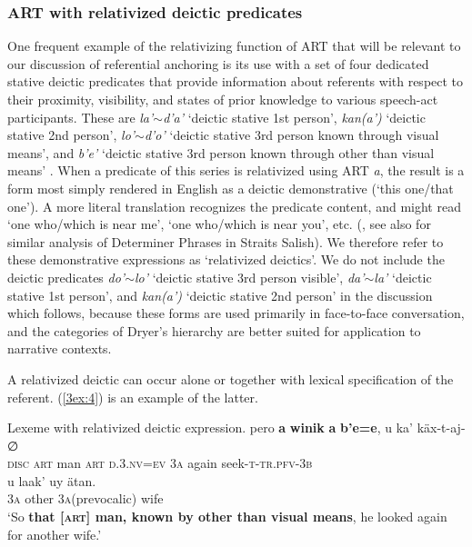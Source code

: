 \documentclass[output=paper]{langsci/langscibook}
\begin{document}
\subsubsection{ART with relativized deictic predicates}\label{3sec:211}

One frequent example of the relativizing function of ART that will be relevant to our discussion of referential anchoring is its use with a set of four dedicated stative deictic predicates that provide information about referents with respect to their proximity, visibility, and states of prior knowledge to various speech-act participants.  These are {\emph{la'$\sim$d'a'}} `deictic stative 1st person', {\emph{kan(a')}} `deictic stative 2nd person', {\emph{lo'$\sim$d'o'}} `deictic stative 3rd person known through visual means', and {\emph{b'e'}} `deictic stative 3rd person known through other than visual means' \citep{danziger:94}.  When a predicate of this series is relativized using ART {\emph{a}}, the result is a form most simply rendered in English as a deictic demonstrative (`this one/that one').  A more literal translation recognizes the predicate content, and might read `one who/which is near me', `one who/which is near you', etc. (\citealt[][891-894]{danziger:94}, see also \citealt[][489-490]{jelinek:95} for similar analysis of Determiner Phrases in Straits Salish).  We therefore refer to these demonstrative expressions as `relativized deictics'.  We do not include the deictic predicates {\emph{do'$\sim$lo'}} `deictic stative 3rd person visible', {\emph{da'$\sim$la'}} `deictic stative 1st person', and {\emph{kan(a')}} `deictic stative 2nd person' in the discussion which follows, because these forms are used primarily in face-to-face conversation, and the categories of Dryer's hierarchy are better suited for application to narrative contexts.

A relativized deictic can occur alone or together with lexical specification of the referent. (\ref{3ex:4}) is an example of the latter.

\begin{exe}
\ex\label{3ex:4}
Lexeme with relativized deictic expression. 
\exi{}
\gll	pero 		{\textbf{a}} 	{\textbf{winik}} 	{\textbf{a}} 	{\textbf{b'e=e}}, 				u 		ka'		k\"ax-t-aj-∅  \\
	{\textsc{disc}}	{\textsc{art}}	man			{\textsc{art}}	{\textsc{d}}.3.{\textsc{nv=ev}}	3{\textsc{a}}	again	seek-{\textsc{t-tr.pfv-3b}} \\
\glt
\exi{}
\gll	u 		laak' 		uy				\"atan. \\
	3{\textsc{a}}	other		3{\textsc{a}}(prevocalic)	wife \\
\glt	`So {\textbf{that [{\textsc{art}}] man, known by other than visual means}}, he looked again for another wife.'
\end{exe}
\end{document}
